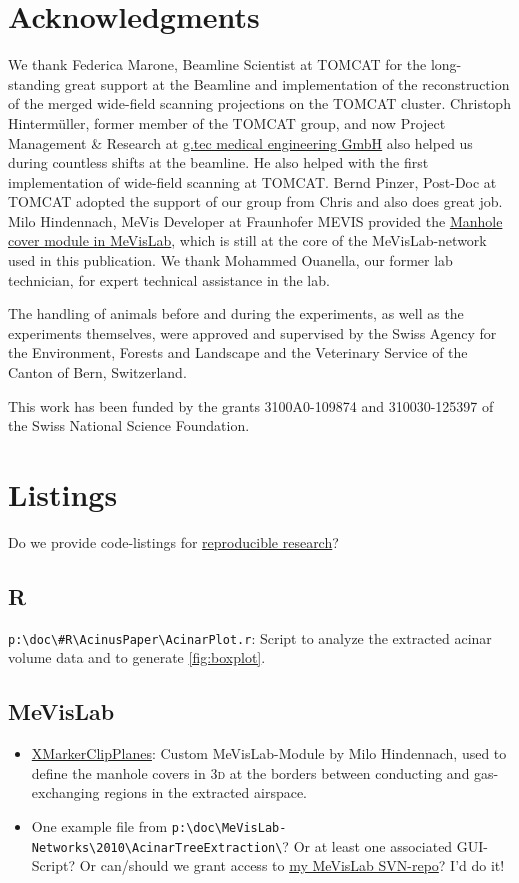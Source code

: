 \documentclass[%
	draft=true,
	paper=a4,%
	twoside=true,%
	abstract=true]{scrartcl}
\newcommand{\threed}{3\textsc{d}\xspace}
\begin{document}
\section{Acknowledgments}
We thank Federica Marone, Beamline Scientist at TOMCAT for the long-standing great support at the Beamline and implementation of the reconstruction of the merged wide-field scanning projections on the TOMCAT cluster. Christoph Hinterm\"{u}ller, former member of the TOMCAT group, and now Project Management \& Research at \href{http://gtec.at/}{g.tec medical engineering GmbH} also helped us during countless shifts at the beamline. He also helped with the first implementation of wide-field scanning at TOMCAT. Bernd Pinzer, Post-Doc at TOMCAT adopted the support of our group from Chris and also does great job. Milo Hindennach, MeVis Developer at Fraunhofer MEVIS provided the \href{http://www.mevis-research.de/cgi-bin/discus/board-auth.cgi?lm=1282233250&file=/839/11760.html}{Manhole cover module in MeVisLab}, which is still at the core of the MeVisLab-network used in this publication. We thank Mohammed Ouanella, our former lab technician, for expert technical assistance in the lab.

The handling of animals before and during the experiments, as well as the experiments themselves, were approved and supervised by the Swiss Agency for the Environment, Forests and Landscape and the Veterinary Service of the Canton of Bern, Switzerland.

This work has been funded by the grants 3100A0-109874 and 310030-125397  of the Swiss National Science Foundation.




\appendix
\section{Listings}
Do we provide code-listings for \href{http://reproducibleresearch.net}{reproducible research}?
\subsection{R}
\verb+p:\doc\#R\AcinusPaper\AcinarPlot.r+: Script to analyze the extracted acinar volume data and to generate \autoref{fig:boxplot}.

\subsection{MeVisLab}
\begin{itemize}
	\item \href{http://www.mevis-research.de/cgi-bin/discus/board-auth.cgi?lm=1282233250&file=/839/11760.html}{XMarkerClipPlanes}: Custom MeVisLab-Module by Milo Hindennach, used to define the manhole covers in \threed at the borders between conducting and gas-exchanging regions in the extracted airspace.
	\item One example file from \verb+p:\doc\MeVisLab-Networks\2010\AcinarTreeExtraction\+? Or at least one associated GUI-Script? Or can/should we grant access to \href{http://code.ana.unibe.ch/websvn/listing.php?repname=MeVisLab-Networks}{my MeVisLab SVN-repo}? I’d do it!
\end{itemize}
 
\end{document}
